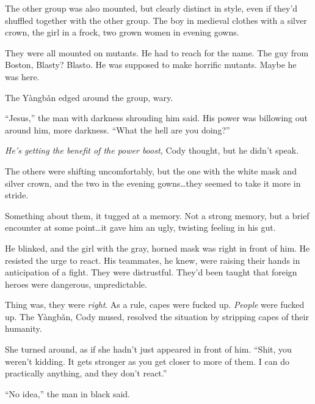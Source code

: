 The other group was also mounted, but clearly distinct in style, even if they'd shuffled together with the other group.  The boy in medieval clothes with a silver crown, the girl in a frock, two grown women in evening gowns.



They were all mounted on mutants.  He had to reach for the name.  The guy from Boston, Blasty?  Blasto.  He was supposed to make horrific mutants.  Maybe he was here.



The Y\`{a}ngb\v{a}n edged around the group, wary.



``Jesus,'' the man with darkness shrouding him said.  His power was billowing out around him, more darkness.  ``What the hell are you doing?''



\emph{He's getting the benefit of the power boost, }Cody thought, but he didn't speak.



The others were shifting uncomfortably, but the one with the white mask and silver crown, and the two in the evening gowns\ldots they seemed to take it more in stride.



Something about them, it tugged at a memory.  Not a strong memory, but a brief encounter at some point\ldots it gave him an ugly, twisting feeling in his gut.



He blinked, and the girl with the gray, horned mask was right in front of him. He resisted the urge to react.  His teammates, he knew, were raising their hands in anticipation of a fight.  They were distrustful.  They'd been taught that foreign heroes were dangerous, unpredictable.



Thing was, they were \emph{right}.  As a rule, capes were fucked up.  \emph{People} were fucked up.  The Y\`{a}ngb\v{a}n, Cody mused, resolved the situation by stripping capes of their humanity.



She turned around, as if she hadn't just appeared in front of him.  ``Shit, you weren't kidding.  It gets stronger as you get closer to more of them.  I can do practically anything, and they don't react.''



``No idea,'' the man in black said.



